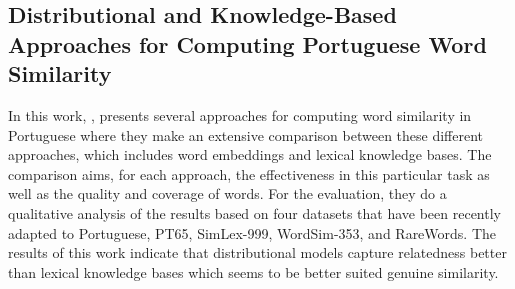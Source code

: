\subsection{Distributional and Knowledge-Based Approaches for Computing Portuguese Word Similarity}

In this work, , presents several approaches for computing word similarity in Portuguese where they make an extensive comparison between these different approaches, which includes word embeddings and lexical knowledge bases. The comparison aims, for each approach, the effectiveness in this particular task as well as the quality and coverage of words. For the evaluation, they do a qualitative analysis of the results based on four datasets that have been recently adapted to Portuguese, PT65, SimLex-999, WordSim-353, and RareWords.
The results of this work indicate that distributional models capture relatedness better than lexical knowledge bases which seems to be better suited genuine similarity.
